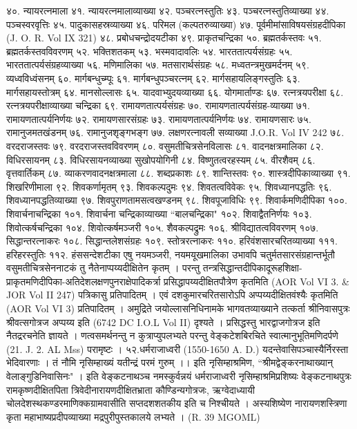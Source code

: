४०. न्यायरत्नमाला
४१. न्यायरत्नमालाव्याख्या
४२. पञ्चरत्नस्तुतिः
४३. पञ्चरत्नस्तुतिव्याख्या
४४. पञ्चस्वरवृत्तिः
४५. पादुकासहस्रव्याख्या
४६. परिमल (कल्पतरुव्याख्या)
४७. पूर्वमीमांसाविषयसंग्रहदीपिका (J. O. R. Vol IX 321)
४८. प्रबोधचन्द्रोदयटीका
४९. प्राकृतचन्द्रिका
५०. ब्रह्मतर्कस्तवः 
५१. ब्रह्मतर्कस्तवविवरणम्
५२. भक्तिशतकम्
५३. भस्मवादावलिः
५४. भारततात्पर्यसंग्रहः
५५. भारततात्पर्यसंग्रहव्याख्या
५६. मणिमालिका
५७. मतसारार्थसंग्रहः
५८. मध्वतन्त्रमुखमर्दनम्
५९. व्यध्वविध्वंसनम्
६०. मार्गबन्धुच्म्पूः
६१. मार्गबन्धुपञ्चरत्नम् 
६२. मार्गसहायलिङ्गस्तुतिः
६३. मार्गसहायस्तोत्रम्
६४. मानसोल्लासः
६५. यादवाभ्युदयव्याख्या
६६. योगमार्ताण्डः
६७. रत्नत्रयपरीक्षा
६८. रत्नत्रयपरीक्षाव्याख्या चन्द्रिका
६९. रामायणतात्पर्यसंग्रहः
७०. रामायणतात्पर्यसंग्रह-व्याख्या
७१. रामायणतात्पर्यनिर्णयः
७२. रामायणसारसंग्रहः
७३. रामायणतात्पर्यनिर्णयः
७४. रामायणसारः
७५. रामानुजमतखंडनम्
७६. रामानुजशृङ्गभङ्ग
७७. लक्षणरत्नावली सव्याख्या J.O.R. Vol IV 242
७८. वरदराजस्तवः
७९. वरदराजस्तवविवरणम्
८०. वसुमतीचित्रसेनविलासः
८१. वादनक्षत्रमालिका
८२. विधिरसायनम्
८३. विधिरसायनव्याख्या सुखोपयोगिनी
८४. विष्णुतत्वरहस्यम्
८५. वीरशैवम्
८६. वृत्तवार्तिकम् 
८७. व्याकरणवादनक्षत्रमाला
८८. शब्दप्रकाशः
८९. शान्तिस्तवः
९०. शास्त्रदीपिकाव्याख्या
९१. शिखरिणीमाला
९२. शिवकर्णामृतम्
९३. शिवकल्पदुमः
९४. शिवतत्वविवेकः
९५. शिवध्यानपद्धतिः
९६. शिवध्यानपद्धतिव्याख्या
९७. शिवपुराणतामसत्वखण्डनम्
९८. शिवपूजाविधिः
९९. शिवार्कमणिदीपिका
१००. शिवार्चनाचन्द्रिका
१०१. शिवार्चना चन्द्रिकाव्याख्या ``बालचन्द्रिका"
१०२. शिवाद्वैतनिर्णयः
१०३. शिवोत्कर्षचन्द्रिका
१०४. शिवोत्कर्षमञ्जरी
१०५. शैवकल्पद्रुमः
१०६. श्रीविद्यातत्वविवरणम्
१०७. सिद्धान्तरत्नाकरः
१०८. सिद्धान्तलेशसंग्रहः
१०९. स्तोत्ररत्नाकरः
११०. हरिवंशसारचरितव्याख्या
१११. हरिहरस्तुतिः 
११२. हंससन्देशटीका
एषु नयमञ्जरी, नयमयूखमालिका उभावपि चतुर्मतसारसंग्रहान्तर्भूतौ वसुमतीचित्रसेननाटकं तु नैतेनाप्पय्यदीक्षितेन कृतम् । परन्तु तन्त्रसिद्धान्तदीपिकादूरूहशिक्षा-प्राकृतमणिदीपिका-अतिदेशलक्षणपुनराक्षेपादिकर्त्रा प्रसिद्धापय्यदीक्षितपौत्रेण कृतमिति (AOR Vol VI 3. & JOR Vol II 247) पत्रिकासु प्रतिपादितम् । एवं दशकुमारचरितसारोऽपि अप्पय्यदीक्षितवंश्यैः कृतमिति (AOR Vol VI 3) प्रतिपादितम् । अमुद्रिते जयोल्लासनिधिनामके भागवतव्याख्याने तत्कर्ता श्रीनिवासपुत्रः श्रीवत्सगोत्रज अप्पय्य इति (6742 DC I.O.L Vol II) दृश्यते । प्रसिद्धस्तु भारद्वाजगोत्रज इति नैतद्ररचनेति ज्ञायते ।
णत्वसमर्थनन्तु न कुत्राप्युपलभ्यते परन्तु वेङ्कटेशबिरचिते स्वात्मानुभूतिमणिदर्पणे (21. J. 2. AL Mss) परामृष्टः ।
५२.धर्मराजाध्वरी (1550-1650 A. D.)
यदन्तेवासिपञ्चास्यैर्निरस्ता भेदिवारणाः । तं नौमि नृसिम्हाख्यं यतीन्द्रं परमं गुरुम् ।। इति नृसिम्हाश्रमिण, ``श्रीमद्वेङ्करनाथाख्यान् वेलाङ्गुडिनिवासिनः" । इति वेङ्कटनाथञ्च नमस्कुर्वन्नयं धर्मराजाध्वरी नृसिम्हाश्रमिप्रशिष्यः वेङ्कटनाथपुत्रः रामकृष्णदीक्षितपिता त्रिवेदीनारायणदीक्षितभ्राता कौण्डिन्यगोत्रजः, ऋग्वेदाध्यायी चोलदेशस्थकण्डरमाणिक्कग्रामवासीति सप्तदशशतकीय इति च निश्चीयते । अस्यशिष्येण नारायणशस्त्रिणा कृता महाभाष्यप्रदीपव्याख्या मद्रपुरीपुस्तकालये लभ्यते । (R. 39 MGOML)
